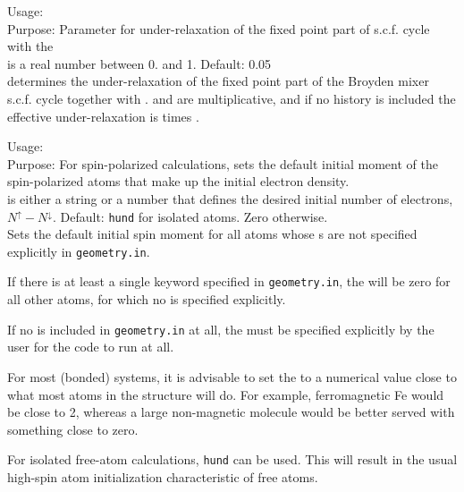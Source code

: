 {
  \noindent
  Usage:   \\[1.0ex]
  Purpose: Parameter for under-relaxation of the fixed point part of s.c.f. cycle with the   \\[1.0ex]
   is a real number between 0. and 1. Default: 0.05\\
}
 determines the under-relaxation of the fixed point part of the Broyden mixer s.c.f. cycle together with .
 and  are multiplicative, and if no history is included the effective under-relaxation is  times .

{
  \noindent
  Usage:   \\[1.0ex]
  Purpose: For spin-polarized calculations, sets the default initial
    moment of the spin-polarized atoms that make up the initial
    electron density. \\[1.0ex]
   is either a string or a number that defines the
    desired initial number of electrons, $N^\uparrow -
    N^\downarrow$. Default: \texttt{hund} for isolated atoms. Zero
    otherwise. \\
}
Sets the default initial spin moment for all atoms whose
s are not specified explicitly in
\texttt{geometry.in}.

If there is at least a single  keyword specified in
\texttt{geometry.in}, the  will be zero for
all other atoms, for which no  is specified
explicitly.

If no  is included in \texttt{geometry.in} at all, the
 must be specified explicitly by the user
for the code to run at all.

For most (bonded) systems, it is advisable to set the
 to a numerical value close to what most
atoms in the structure will do. For example, ferromagnetic Fe would be close to
2, whereas a large non-magnetic molecule would be better served with something
close to zero.

For isolated free-atom calculations, 
\texttt{hund} can be used. This will result in the usual high-spin atom
initialization characteristic of free atoms.

